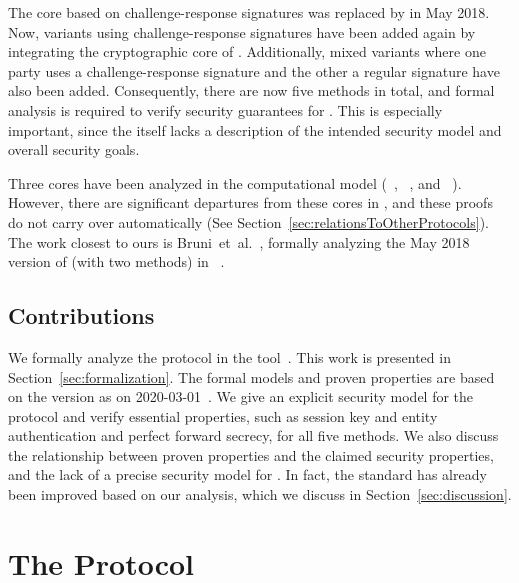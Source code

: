 \documentclass[runningheads, envcountsame, hidelinks, a4paper, x11names]{article}
\begin{document}
The core based on challenge-response signatures was replaced by \mSigma{}
in May 2018.
%
Now, variants using challenge-response signatures have been added again by
integrating the cryptographic core of \mOptls{}.
%
Additionally, mixed variants where one party uses a challenge-response
signature and the other a regular signature have also been added.
%
Consequently, there are now five methods in total, and formal analysis is
required to verify security guarantees for \mEdhoc.
%
This is especially important, since the \mSpec{} itself lacks a description
of the intended security model and overall security goals.
%

Three cores have been analyzed in the computational model (\mSigma{}~\cite{DBLP:conf/crypto/CanettiK02},
\mOptls{}~\cite{DBLP:conf/eurosp/KrawczykW16}, and
\mNoise{}~\cite{DBLP:conf/eurosp/KobeissiNB19}).
%
However, there are significant departures from these cores in \mEdhoc, and
these proofs do not carry over automatically
(See Section~\ref{sec:relationsToOtherProtocols}).
%
The work closest to ours is Bruni~et~al.~\cite{DBLP:conf/secsr/BruniJPS18},
formally analyzing the May 2018 version of \mEdhoc{} (with two methods) in
\mProverif~\cite{DBLP:conf/csfw/Blanchet01}.
%

\subsection{Contributions}
\label{sec:contributions}
We formally analyze the \mEdhoc{} protocol in the \mTamarin{}
tool~\cite{DBLP:conf/cav/MeierSCB13}.
%
This work is presented in Section~\ref{sec:formalization}.
%
The formal models and proven properties are based on the version as on
2020-03-01~\cite{selander-lake-edhoc-01}.
%
We give an explicit security model for the protocol and verify essential
properties, such as session key and entity authentication and perfect forward
secrecy, for all five methods.
%
We also discuss the relationship between proven properties and the claimed
security properties, and the lack of a precise security model for \mEdhoc{}.
%
In fact, the standard has already been improved based on our analysis,
which we discuss in Section~\ref{sec:discussion}.
%

\section{The \mEdhoc{} Protocol}
\label{sec:edhoc}

\end{document}
